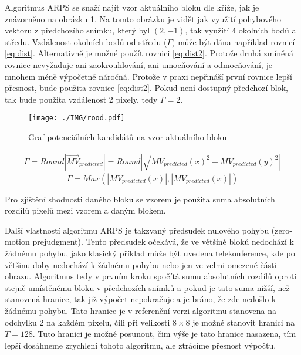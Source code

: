 \documentclass[thesis=M,czech]{FITthesis}[2016/06/26]
\begin{document}
Algoritmus ARPS se snaží najít vzor aktuálního bloku dle kříže, jak je znázorněno na obrázku \ref{fig:rood}. Na tomto obrázku je vidět jak využití pohybového vektoru z předchozího snímku, který byl $(2,-1)$, tak využití 4  okolních bodů a středu. Vzdálenost okolních bodů od středu ($\Gamma$) může být dána například rovnicí \ref{eq:dist}. Alternativně je možné použít rovnici \ref{eq:dist2}. Protože druhá zmíněná rovnice nevyžaduje ani zaokrouhlování, ani umocňování a odmocňování, je mnohem méně výpočetně náročná. Protože v praxi nepřináší první rovnice lepší přesnost, bude použita rovnice \ref{eq:dist2}. Pokud není dostupný předchozí blok, tak bude použita vzdálenost 2 pixely, tedy $\Gamma=2$.
\begin{figure}[h]\centering
\texttt{[image: ./IMG/rood.pdf]}
\caption{Graf potenciálních kandidátů na vzor aktuálního bloku}
\label{fig:rood}
\end{figure}
\begin{multline}\label{eq:dist}
\Gamma = \mathit{Round}\left|\overrightarrow{MV}_{predicted}\right| =\mathit{Round}\left|\sqrt{MV_{predicted}(x)^2+MV_{predicted}(y)^2}\right|
\end{multline}
\begin{equation}\label{eq:dist2}
\Gamma = \mathit{Max}(\left|MV_{predicted}(x)\right|,\left|MV_{predicted}(x)\right|)
\end{equation}

Pro zjištění shodnosti daného bloku se vzorem je použita suma absolutních rozdílů pixelů mezi vzorem a daným blokem. 

Další vlastností algoritmu ARPS je takzvaný předsudek nulového pohybu (zero-motion prejudgment). Tento předsudek očekává, že ve většině bloků nedochází k žádnému pohybu, jako klasický příklad může být uvedena telekonference, kde po většinu doby nedochází k žádnému pohybu nebo jen ve velmi omezené části obrazu. Algoritmus tedy v prvním kroku spočítá sumu absolutních rozdílů oproti stejně umístěnému bloku v předchozích snímků a pokud je tato suma nižší, než stanovená hranice, tak již výpočet nepokračuje a je bráno, že zde nedošlo k žádnému pohybu. Tato hranice je v referenční verzi algoritmu stanovena na odchylku 2 na každém pixelu, čili při velikosti $8 \times 8$ je možné stanovit hranici na $T=128$. Tuto hranici je možné posunout, čim výše je tato hranice nasazena, tím lepší dosáhneme zrychlení tohoto algoritmu, ale ztrácíme přesnost výpočtu.
\end{document}
